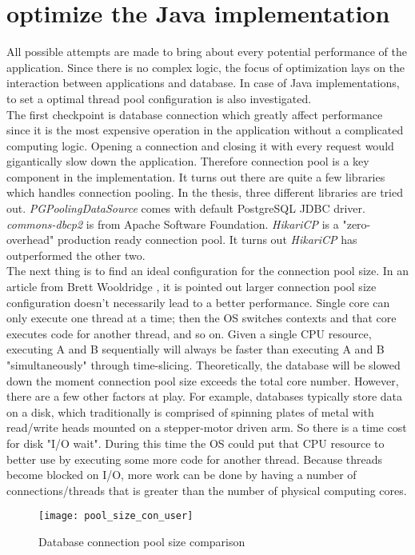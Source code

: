 \section{optimize the Java implementation}
All possible attempts are made to bring about every potential performance of the application. Since there is no complex logic, the focus of optimization lays on the interaction between applications and database. In case of Java implementations, to set a optimal thread pool configuration is also investigated. \\
The first checkpoint is database connection which greatly affect performance since it is the most expensive operation in the application without a complicated computing logic. Opening a connection and closing it with every request would gigantically slow down the application. Therefore connection pool is a key component in the implementation. It turns out there are quite a few libraries which handles connection pooling. In the thesis,  three different libraries are tried out. \textit{PGPoolingDataSource}  \citep{pgpool}   comes with default PostgreSQL JDBC driver. \textit{commons-dbcp2} \citep{dbcp} is from Apache Software Foundation. \textit{HikariCP} is a "zero-overhead" production ready connection pool. It turns out \textit{HikariCP} \citep{hikari} has outperformed the other two. \\
The next thing is to find an ideal configuration for the connection pool size. In an article from Brett Wooldridge \citep{poolsize}, it is pointed out larger connection pool size configuration doesn't necessarily lead to a better performance. Single core can only execute one thread at a time; then the OS switches contexts and that core executes code for another thread, and so on. Given a single CPU resource, executing A and B sequentially will always be faster than executing A and B "simultaneously" through time-slicing. Theoretically, the database will be slowed down the moment connection pool size exceeds the total core number. However, there are a few other factors at play. For example, databases typically store data on a disk, which traditionally is comprised of spinning plates of metal with read/write heads mounted on a stepper-motor driven arm. So there is a time cost for disk "I/O wait". During this time the OS could put that CPU resource to better use by executing some more code for another thread. Because threads become blocked on I/O,  more work can be done by having a number of connections/threads that is greater than the number of physical computing cores.
\begin{figure}[h]
	\centering
	\texttt{[image: pool\_size\_con\_user]}
	\caption{Database connection pool size comparison}
	\label{pool-comparison}
\end{figure}
